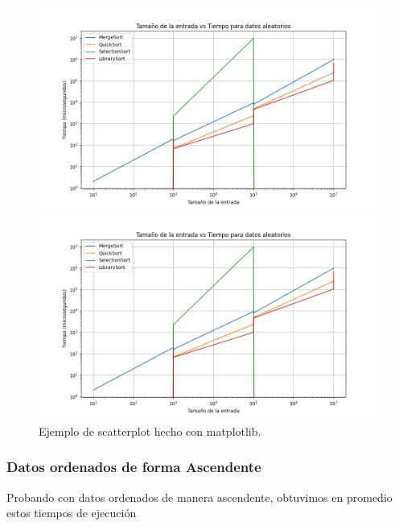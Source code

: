 \begin{figure}[H]
    \centering
    \begin{minipage}[t]{0.5\textwidth}
        \includegraphics[width=\textwidth]{../code/sorting/data/plots/aleatorio_plot.png}
    \end{minipage}%
    \begin{minipage}[t]{0.5\textwidth}
        \includegraphics[width=\textwidth]{../code/sorting/data/plots/aleatorio_plot.png}
     \end{minipage}%
    \caption{Ejemplo de scatterplot hecho con matplotlib.}
    \label{fig:scatterplot_3}
\end{figure}

\subsubsection*{Datos ordenados de forma Ascendente}
Probando con datos ordenados de manera ascendente,  obtuvimos en promedio estos tiempos de ejecución

